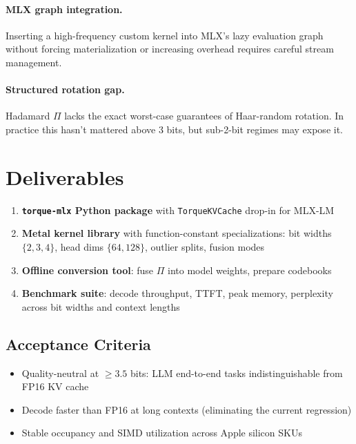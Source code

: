 \documentclass[nobib]{tufte-handout}
\begin{document}
\paragraph{MLX graph integration.}
Inserting a high-frequency custom kernel into MLX's lazy evaluation graph without forcing materialization or increasing overhead requires careful stream management.

\paragraph{Structured rotation gap.}
Hadamard $\Pi$ lacks the exact worst-case guarantees of Haar-random rotation. In practice this hasn't mattered above 3 bits, but sub-2-bit regimes may expose it.


\section{Deliverables}

\begin{enumerate}
  \item \textbf{\texttt{torque-mlx} Python package} with \texttt{TorqueKVCache} drop-in for MLX-LM
  \item \textbf{Metal kernel library} with function-constant specializations: bit widths $\{2,3,4\}$, head dims $\{64,128\}$, outlier splits, fusion modes
  \item \textbf{Offline conversion tool}: fuse $\Pi$ into model weights, prepare codebooks
  \item \textbf{Benchmark suite}: decode throughput, TTFT, peak memory, perplexity across bit widths and context lengths
\end{enumerate}

\subsection{Acceptance Criteria}

\begin{itemize}
  \item Quality-neutral at ${\ge}3.5$ bits: LLM end-to-end tasks indistinguishable from FP16 KV cache
  \item Decode faster than FP16 at long contexts (eliminating the current regression)
  \item Stable occupancy and SIMD utilization across Apple silicon SKUs
\end{itemize}
\end{document}
